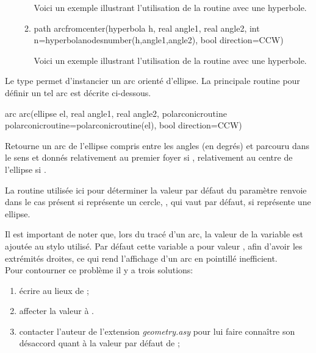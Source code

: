 \documentclass[pdftex]{article}
\newcommand{\geo}{l'extension \emph{geometry.asy}\xspace}
\begin{document}
\begin{itemize}
\begin{enumerate}
    Voici un exemple illustrant
    l'utilisation de la routine  avec une hyperbole.
  \item {}
    \begin{Vcolor}
      path arcfromcenter(hyperbola h, real angle1, real angle2,
      int n=hyperbolanodesnumber(h,angle1,angle2), bool direction=CCW)
    \end{Vcolor}
    Voici un exemple illustrant
    l'utilisation de la routine  avec une hyperbole.
  \end{enumerate}
\end{itemize}

Le type  permet d'instancier un arc orienté d'ellipse. La
principale routine pour définir un tel arc est décrite
ci-dessous.
\begin{Vcolor}
  arc arc(ellipse el, real angle1, real angle2,
  polarconicroutine polarconicroutine=polarconicroutine(el),
  bool direction=CCW)
\end{Vcolor}
Retourne un arc de l'ellipse  compris entre les
angles (en degrés)  et  parcouru dans le
sens  et donnés relativement au premier foyer
si , relativement au centre de
l'ellipse si .

La routine 
 utilisée ici pour déterminer la
valeur par défaut du paramètre  renvoie dans
le cas présent  si  représente un cercle,
, qui vaut  par défaut,
si  représente une ellipse.

Il est important de noter que, lors du tracé d'un arc, la
valeur de la variable  est ajoutée au stylo
utilisé. Par défaut cette variable a pour valeur ,
afin d'avoir les extrémités droites, ce qui rend l'affichage d'un
arc en pointillé inefficient.\\
Pour contourner ce problème il y a trois solutions:
\begin{enumerate}
\item écrire  au lieux de
  ;
\item affecter la valeur  à .
\item contacter l'auteur de \geo pour lui faire connaître
  son désaccord quant à la valeur par défaut de ;
\end{enumerate}
\end{document}
